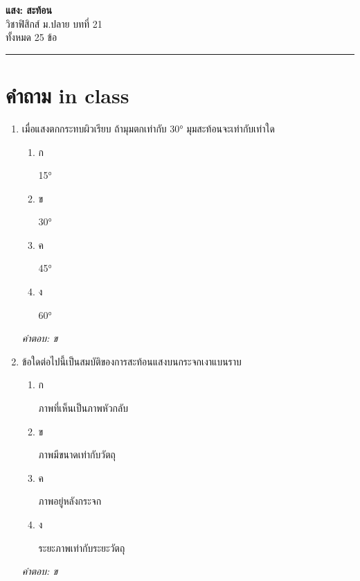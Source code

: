 \documentclass[12pt]{article}
\begin{document}
\begin{center}
{\Large\textbf{แสง: สะท้อน}}\\[6pt]
{\normalsize วิชาฟิสิกส์ ม.ปลาย บทที่ 21}\\[4pt]
{\footnotesize ทั้งหมด 25 ข้อ}
\end{center}
\hrule
\bigskip

\section*{คำถาม in class}
\begin{enumerate}[label=\arabic*., itemsep=0.5\baselineskip, topsep=0.5\baselineskip, leftmargin=*]
\item เมื่อแสงตกกระทบผิวเรียบ ถ้ามุมตกเท่ากับ 30° มุมสะท้อนจะเท่ากับเท่าใด
\begin{enumerate}[label=\alph*)., itemsep=0.3\baselineskip, topsep=0.3\baselineskip]
\item ก\ 
\begin{minipage}[t]{0.9\linewidth}
\raggedright 15°
\end{minipage}
\item ข\ 
\begin{minipage}[t]{0.9\linewidth}
\raggedright 30°
\end{minipage}
\item ค\ 
\begin{minipage}[t]{0.9\linewidth}
\raggedright 45°
\end{minipage}
\item ง\ 
\begin{minipage}[t]{0.9\linewidth}
\raggedright 60°
\end{minipage}
\end{enumerate}
\vspace{-0.3\baselineskip}
\begin{small}
\textit{คำตอบ: ข}
\end{small}

\item ข้อใดต่อไปนี้เป็นสมบัติของการสะท้อนแสงบนกระจกเงาแบนราบ
\begin{enumerate}[label=\alph*)., itemsep=0.3\baselineskip, topsep=0.3\baselineskip]
\item ก\ 
\begin{minipage}[t]{0.9\linewidth}
\raggedright ภาพที่เห็นเป็นภาพหัวกลับ
\end{minipage}
\item ข\ 
\begin{minipage}[t]{0.9\linewidth}
\raggedright ภาพมีขนาดเท่ากับวัตถุ
\end{minipage}
\item ค\ 
\begin{minipage}[t]{0.9\linewidth}
\raggedright ภาพอยู่หลังกระจก
\end{minipage}
\item ง\ 
\begin{minipage}[t]{0.9\linewidth}
\raggedright ระยะภาพเท่ากับระยะวัตถุ
\end{minipage}
\end{enumerate}
\vspace{-0.3\baselineskip}
\begin{small}
\textit{คำตอบ: ข}
\end{small}


\end{enumerate}
\end{document}
